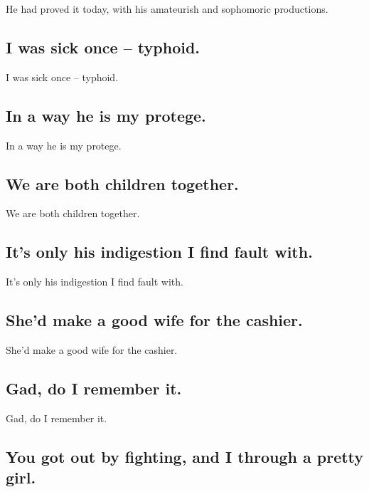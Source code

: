 \documentclass[]{article}
\begin{document}
He had proved it today, with his amateurish and sophomoric productions.

\hypertarget{i-was-sick-once-typhoid.}{%
\subsection{I was sick once --
typhoid.}\label{i-was-sick-once-typhoid.}}

I was sick once -- typhoid.

\hypertarget{in-a-way-he-is-my-protege.}{%
\subsection{In a way he is my
protege.}\label{in-a-way-he-is-my-protege.}}

In a way he is my protege.

\hypertarget{we-are-both-children-together.}{%
\subsection{We are both children
together.}\label{we-are-both-children-together.}}

We are both children together.

\hypertarget{its-only-his-indigestion-i-find-fault-with.}{%
\subsection{It's only his indigestion I find fault
with.}\label{its-only-his-indigestion-i-find-fault-with.}}

It's only his indigestion I find fault with.

\hypertarget{shed-make-a-good-wife-for-the-cashier.}{%
\subsection{She'd make a good wife for the
cashier.}\label{shed-make-a-good-wife-for-the-cashier.}}

She'd make a good wife for the cashier.

\hypertarget{gad-do-i-remember-it.}{%
\subsection{Gad, do I remember it.}\label{gad-do-i-remember-it.}}

Gad, do I remember it.

\hypertarget{you-got-out-by-fighting-and-i-through-a-pretty-girl.}{%
\subsection{You got out by fighting, and I through a pretty
girl.}\label{you-got-out-by-fighting-and-i-through-a-pretty-girl.}}
\end{document}
